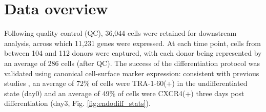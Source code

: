 
\section{Data overview}

Following quality control (QC), 36,044 cells were retained for downstream analysis, across which 11,231 genes were expressed.
At each time point, cells from between 104 and 112 donors were captured, with each donor being represented by an average of 286 cells (after QC). 
The success of the differentiation protocol was validated using canonical cell-surface marker expression: consistent with previous studies \cite{chu2016single}, an average of 72\% of cells were TRA-1-60(+) in the undifferentiated state (day0) and an average of 49\% of cells were CXCR4(+) three days post differentiation (day3, Fig. \ref{fig:endodiff_stats}).
 
